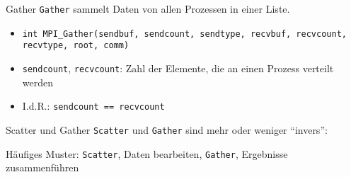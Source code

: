 \documentclass{beamer}
\begin{document}
\begin{frame}{Gather}
	\texttt{Gather} sammelt Daten von allen Prozessen in einer Liste.

	\begin{figure}
	\end{figure}

	\begin{itemize}
		\item {\footnotesize \texttt{int MPI\_Gather(sendbuf, sendcount, sendtype, recvbuf, recvcount, recvtype, root, comm)}}
		\item \texttt{sendcount}, \texttt{recvcount}: Zahl der Elemente, die an einen Prozess verteilt werden
		\item I.d.R.: \texttt{sendcount == recvcount}
	\end{itemize}
\end{frame}

\begin{frame}{Scatter und Gather}
	\texttt{Scatter} und \texttt{Gather} sind mehr oder weniger \enquote{invers}:


    Häufiges Muster: \texttt{Scatter}, Daten bearbeiten, \texttt{Gather}, Ergebnisse zusammenführen
\end{frame}
\end{document}
